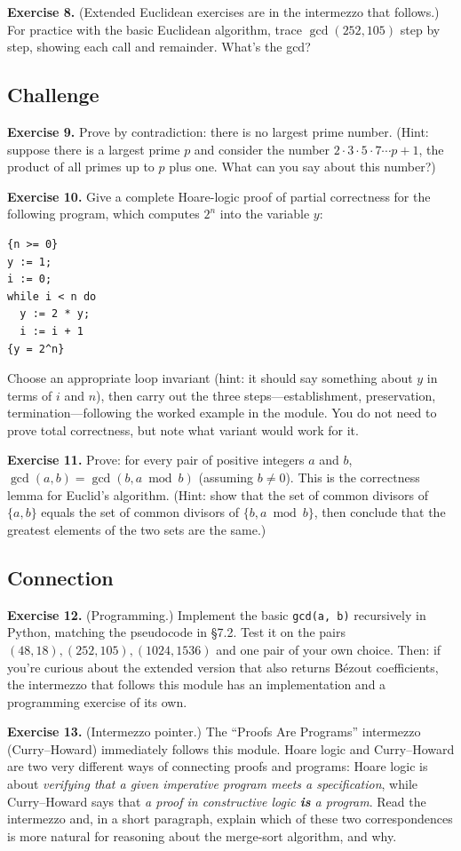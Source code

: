 \documentclass[11pt]{article}
\begin{document}
\bigskip
\textbf{Exercise 8.}\label{ex:m7:8} (Extended Euclidean exercises are in the intermezzo that follows.) For practice with the basic Euclidean algorithm, trace $\gcd(252, 105)$ step by step, showing each call and remainder. What's the gcd?

\subsection*{Challenge}

\textbf{Exercise 9.}\label{ex:m7:9} Prove by contradiction: there is no largest prime number. (Hint: suppose there is a largest prime $p$ and consider the number $2 \cdot 3 \cdot 5 \cdot 7 \cdots p + 1$, the product of all primes up to $p$ plus one. What can you say about this number?)

\bigskip
\textbf{Exercise 10.}\label{ex:m7:10} Give a complete Hoare-logic proof of partial correctness for the following program, which computes $2^n$ into the variable $y$:
\begin{lstlisting}
{n >= 0}
y := 1;
i := 0;
while i < n do
  y := 2 * y;
  i := i + 1
{y = 2^n}
\end{lstlisting}
Choose an appropriate loop invariant (hint: it should say something about $y$ in terms of $i$ and $n$), then carry out the three steps---establishment, preservation, termination---following the worked example in the module. You do not need to prove total correctness, but note what variant would work for it.

\bigskip
\textbf{Exercise 11.}\label{ex:m7:11} Prove: for every pair of positive integers $a$ and $b$, $\gcd(a, b) = \gcd(b, a \bmod b)$ (assuming $b \neq 0$). This is the correctness lemma for Euclid's algorithm. (Hint: show that the set of common divisors of $\{a, b\}$ equals the set of common divisors of $\{b, a \bmod b\}$, then conclude that the greatest elements of the two sets are the same.)

\subsection*{Connection}

\textbf{Exercise 12.}\label{ex:m7:12} (Programming.) Implement the basic \texttt{gcd(a, b)} recursively in Python, matching the pseudocode in §7.2. Test it on the pairs $(48, 18), (252, 105), (1024, 1536)$ and one pair of your own choice. Then: if you're curious about the extended version that also returns B\'ezout coefficients, the intermezzo that follows this module has an implementation and a programming exercise of its own.

\bigskip
\textbf{Exercise 13.}\label{ex:m7:13} (Intermezzo pointer.) The ``Proofs Are Programs'' intermezzo (Curry--Howard) immediately follows this module. Hoare logic and Curry--Howard are two very different ways of connecting proofs and programs: Hoare logic is about \emph{verifying that a given imperative program meets a specification}, while Curry--Howard says that \emph{a proof in constructive logic \textbf{is} a program}. Read the intermezzo and, in a short paragraph, explain which of these two correspondences is more natural for reasoning about the merge-sort algorithm, and why.
\end{document}
